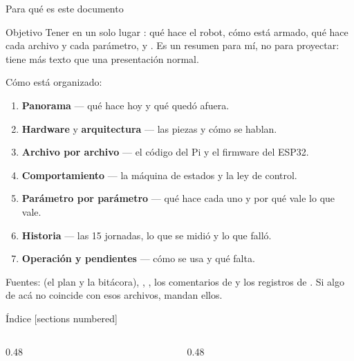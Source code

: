 
\begin{frame}{Para qué es este documento}
  \begin{block}{Objetivo}
    Tener en un solo lugar : qué hace el robot, cómo
    está armado, qué hace cada archivo y cada parámetro, y . Es un resumen para mí, no para proyectar: tiene más
    texto que una presentación normal.
  \end{block}

  \vspace{0.3em}
  Cómo está organizado:
  \begin{enumerate}
    \item \textbf{Panorama} --- qué hace hoy y qué quedó afuera.
    \item \textbf{Hardware} y \textbf{arquitectura} --- las piezas y cómo se hablan.
    \item \textbf{Archivo por archivo} --- el código del Pi y el firmware del ESP32.
    \item \textbf{Comportamiento} --- la máquina de estados y la ley de control.
    \item \textbf{Parámetro por parámetro} --- qué hace cada uno y por qué vale lo que vale.
    \item \textbf{Historia} --- las 15 jornadas, lo que se midió y lo que falló.
    \item \textbf{Operación y pendientes} --- cómo se usa y qué falta.
  \end{enumerate}

  \vspace{0.2em}
  {\footnotesize Fuentes:  (el plan y la bitácora), ,
  , los comentarios de  y los registros de
  . Si algo de acá no coincide con esos archivos, mandan ellos.}
\end{frame}

\begin{frame}{Índice}
  [sections numbered]
  \begin{columns}[T,onlytextwidth]
    \begin{column}{0.48\textwidth}
      {\footnotesize\tableofcontents[sections={1-8},hideallsubsections]}
    \end{column}
    \begin{column}{0.48\textwidth}
      {\footnotesize\tableofcontents[sections={9-15},hideallsubsections]}
    \end{column}
  \end{columns}
\end{frame}

